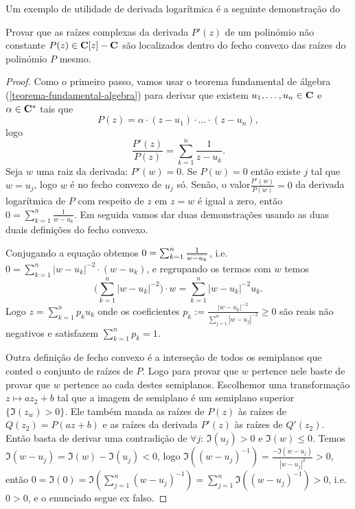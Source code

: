 Um exemplo de utilidade de derivada logarítmica é a seguinte demonstração do
\begin{teorema}
Provar que as raízes complexas da derivada $P'(z)$ de um polinómio não constante $P(z)\in\mathbf{C}[z]-\mathbf{C}$
são localizados dentro
do fecho convexo das raízes do polinómio $P$ mesmo.
\end{teorema}
\begin{proof}
Como o primeiro passo, vamos usar o teorema fundamental de álgebra (\cref{teorema-fundamental-algebra})
para derivar que existem $u_1,\dots,u_n \in \mathbf{C}$ e $\alpha \in \mathbf{C}^*$ tais que
\[ P(z) = \alpha \cdot (z-u_1) \cdot \dots \cdot (z-u_n),\]
logo
\[ \frac{P'(z)}{P(z)} = \sum_{k=1}^n \frac{1}{z-u_k} . \]
Seja $w$ uma raiz da derivada: $P'(w)=0$. Se $P(w)=0$ então existe $j$ tal que $w=u_j$,
logo $w$ é no fecho convexo de $u_j$ só. Senão, o valor$\frac{P'(w)}{P(w)} = 0$
da derivada logarítmica de $P$ com respeito de $z$ em $z=w$ é igual a zero, então
$0 = \sum_{k=1}^n \frac{1}{w-u_k}$.
Em seguida vamos dar duas demonstrações usando as duas duais definições do fecho convexo.

Conjugando a equação obtemos $0 = \sum_{k=1}^n \frac{1}{\overline{w-u_k}}$,
i.e. $0 = \sum_{k=1}^n |w-u_k|^{-2}\cdot (w-u_k)$,
e regrupando os termos com $w$ temos
\[ \big(\sum_{k=1}^n |w-u_k|^{-2}\big) \cdot w = \sum_{k=1}^n |w-u_k|^{-2} u_k. \]
Logo $z = \sum_{k=1}^n p_k u_k$
onde os coeficientes
$p_k := \frac{|w-u_k|^{-2}}{\sum_{j=1}^n |w-u_j|^{-2}} \geq 0$
são reais não negativos e satisfazem $\sum_{k=1}^n p_k = 1$.

Outra definição de fecho convexo é a interseção de todos os semiplanos que conted o conjunto de raízes de $P$.
Logo para provar que $w$ pertence nele baste de provar que $w$ pertence ao cada destes semiplanos.
Escolhemor uma transformação $z\mapsto a z_2 + b$ tal que a imagem de semiplano é um semiplano superior
$\{\Im(z_w)>0\}$.
Ele também manda as raízes de $P(z)$ às raízes de $Q(z_2) = P(az+b)$ e as raízes da derivada
$P'(z)$ às raízes de $Q'(z_2)$. Então basta de derivar uma contradição de $\forall j:\,\Im(u_j)>0$
e $\Im(w)\leq 0$. Temos $\Im(w-u_j) = \Im(w)-\Im(u_j)<0$,
logo $\Im((w-u_j)^{-1}) = \frac{-\Im(w-u_j)}{|w-u_j|^2} > 0$,
então $0 = \Im(0) = \Im(\sum_{j=1}^n (w-u_j)^{-1}) = \sum_{j=1}^n \Im((w-u_j)^{-1}) > 0$, i.e. $0>0$,
e o enunciado segue ex falso.
\end{proof}

